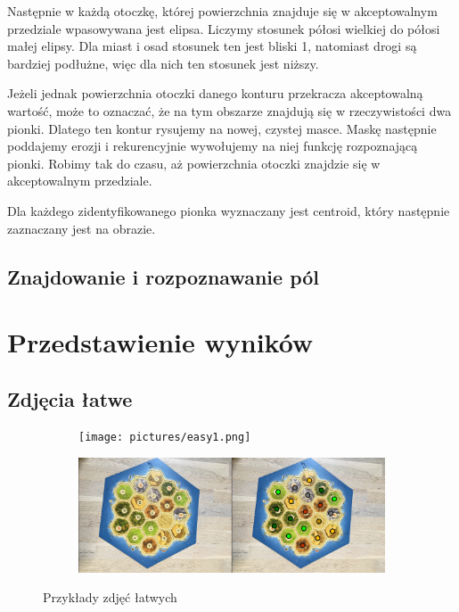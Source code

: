 \documentclass[a4paper]{article}
\begin{document}
    Następnie w każdą otoczkę, której powierzchnia znajduje się w akceptowalnym przedziale wpasowywana jest elipsa.
    Liczymy stosunek półosi wielkiej do półosi małej elipsy. Dla miast i osad stosunek ten jest bliski 1, natomiast drogi są bardziej podłużne, więc dla nich ten stosunek jest niższy.

    Jeżeli jednak powierzchnia otoczki danego konturu przekracza akceptowalną wartość, może to oznaczać, że na tym obszarze znajdują się w rzeczywistości dwa pionki. Dlatego ten kontur rysujemy na nowej, czystej masce. Maskę następnie poddajemy erozji i rekurencyjnie wywołujemy na niej funkcję rozpoznającą pionki. Robimy tak do czasu, aż powierzchnia otoczki znajdzie się w akceptowalnym przedziale.

    Dla każdego zidentyfikowanego pionka wyznaczany jest centroid, który następnie zaznaczany jest na obrazie.
    
    \subsection{Znajdowanie i rozpoznawanie pól}
      
\section{Przedstawienie wyników}
    \subsection{Zdjęcia łatwe}
    \begin{figure}[H]
        \begin{subfigure}[]{\linewidth}
            \texttt{[image: pictures/easy1.png]}
        \end{subfigure}

        \begin{subfigure}[]{\linewidth}
            \includegraphics[width=\linewidth]{pictures/easy2.png}
        \end{subfigure}
        \caption{Przykłady zdjęć łatwych}
        \label{fig:step1}
    \end{figure}
    
\end{document}
